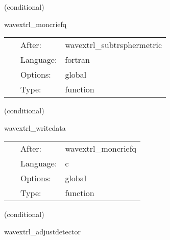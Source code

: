 \documentclass{article}
\begin{document}
\vspace{5mm}

   (conditional) 

\hspace{5mm} wavextrl\_moncriefq 

\hspace{5mm}{\it compute moncrief qeven, qodd from regge wheeler quantities } 


\hspace{5mm}

 \begin{tabular*}{160mm}{cll} 
~ & After:  & wavextrl\_subtrsphermetric \\ 
~ & Language:  & fortran \\ 
~ & Options:  & global \\ 
~ & Type:  & function \\ 
\end{tabular*} 


\vspace{5mm}

   (conditional) 

\hspace{5mm} wavextrl\_writedata 

\hspace{5mm}{\it write out results to disk and stdout - one file for each detector and (l,m) mode } 


\hspace{5mm}

 \begin{tabular*}{160mm}{cll} 
~ & After:  & wavextrl\_moncriefq \\ 
~ & Language:  & c \\ 
~ & Options:  & global \\ 
~ & Type:  & function \\ 
\end{tabular*} 


\vspace{5mm}

   (conditional) 

\hspace{5mm} wavextrl\_adjustdetector 

\hspace{5mm}{\it decrease current\_detector, go the the next detector } 


\hspace{5mm}
\end{document}
